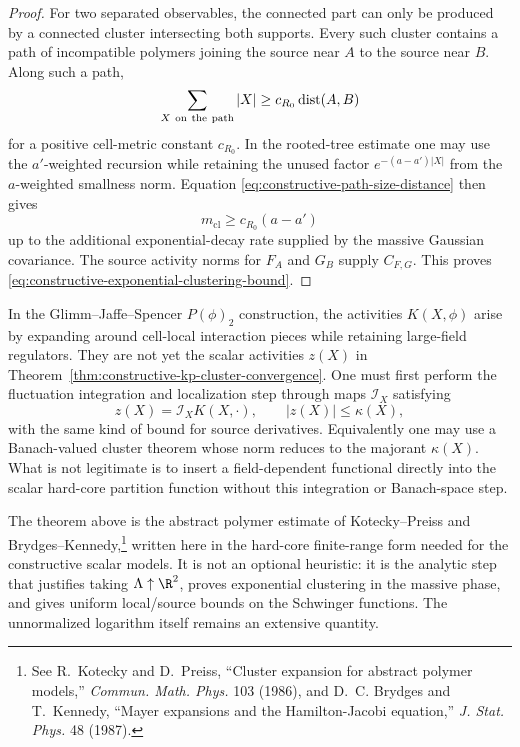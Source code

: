 \begin{proof}
For two separated observables, the connected part can only be produced by a
connected cluster intersecting both supports.  Every such cluster contains a
path of incompatible polymers joining the source near \(A\) to the source
near \(B\).  Along such a path,
\begin{equation}
  \sum_{X\ {\rm on\ the\ path}} |X|
  \geq
  c_{R_0}\operatorname{dist}(A,B)
  \label{eq:constructive-path-size-distance}
\end{equation}
for a positive cell-metric constant \(c_{R_0}\).  In the rooted-tree
estimate one may use the \(a'\)-weighted recursion while retaining the
unused factor \(e^{-(a-a')|X|}\) from the \(a\)-weighted smallness norm.
Equation \eqref{eq:constructive-path-size-distance} then gives
\[
  m_{\mathrm{cl}}\geq c_{R_0}(a-a')
\]
up to the additional exponential-decay rate supplied by the massive
Gaussian covariance.  The source activity norms for \(F_A\) and \(G_B\)
supply \(C_{F,G}\).  This proves
\eqref{eq:constructive-exponential-clustering-bound}.
\end{proof}

In the Glimm--Jaffe--Spencer \(P(\phi)_2\) construction, the activities
\(K(X,\phi)\) arise by expanding around cell-local interaction pieces while
retaining large-field regulators.  They are not yet the scalar activities
\(z(X)\) in Theorem~\ref{thm:constructive-kp-cluster-convergence}.  One must
first perform the fluctuation integration and localization step through maps
\(\mathcal I_X\) satisfying
\[
  z(X)=\mathcal I_X K(X,\cdot),
  \qquad
  |z(X)|\leq\kappa(X),
\]
with the same kind of bound for source derivatives.  Equivalently one may use
a Banach-valued cluster theorem whose norm reduces to the majorant
\(\kappa(X)\).  What is not legitimate is to insert a field-dependent
functional directly into the scalar hard-core partition function without this
integration or Banach-space step.

The theorem above is the abstract polymer estimate of Kotecky--Preiss and
Brydges--Kennedy,\footnote{See
R.~Kotecky and D.~Preiss, ``Cluster expansion for abstract polymer models,''
\emph{Commun. Math. Phys.} 103 (1986), and D.~C. Brydges and T.~Kennedy,
``Mayer expansions and the Hamilton-Jacobi equation,'' \emph{J. Stat. Phys.}
48 (1987).} written here in the hard-core finite-range form needed for the
constructive scalar models.  It is not an optional heuristic: it is the
analytic step that justifies taking \(\Lambda\uparrow\R^2\), proves
exponential clustering in the massive phase, and gives uniform local/source
bounds on the Schwinger functions.  The unnormalized logarithm itself remains
an extensive quantity.

